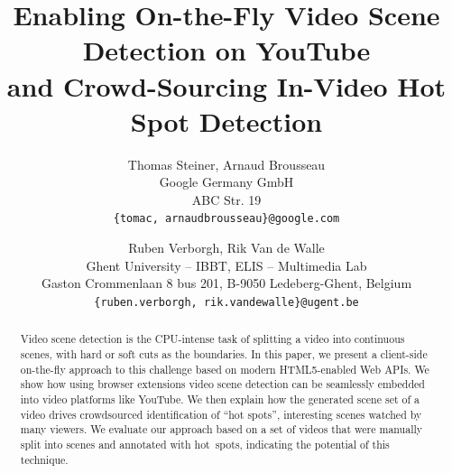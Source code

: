 \documentclass[10pt,twocolumn,letterpaper]{article}
\begin{document}
\title{Enabling On-the-Fly Video Scene Detection on YouTube\\ and Crowd-Sourcing In-Video Hot Spot Detection}

\author{Thomas Steiner, Arnaud Brousseau\\
Google Germany GmbH\\
ABC Str. 19\\
{\tt\small \{tomac, arnaudbrousseau\}@google.com}
\and
Ruben Verborgh, Rik Van de Walle \\
Ghent University -- IBBT, ELIS -- Multimedia Lab\\
Gaston Crommenlaan 8 bus 201, B-9050 Ledeberg-Ghent, Belgium\\
{\tt\small \{ruben.verborgh, rik.vandewalle\}@ugent.be}
}

\maketitle

\begin{abstract}
Video scene detection is the CPU-intense task of splitting a video into continuous scenes, with hard or soft cuts as the boundaries. In this paper, we present a client-side on-the-fly approach to this challenge based on modern HTML5-enabled Web APIs. We show how using browser extensions video scene detection can be seamlessly embedded into video platforms like YouTube.
We then explain how the generated scene set of a video drives crowdsourced identification of ``hot spots'', interesting scenes watched by many viewers. We evaluate our approach based on a set of videos that were manually split into scenes and annotated with hot~spots, indicating the potential of this technique.
\end{abstract}

\end{document}
